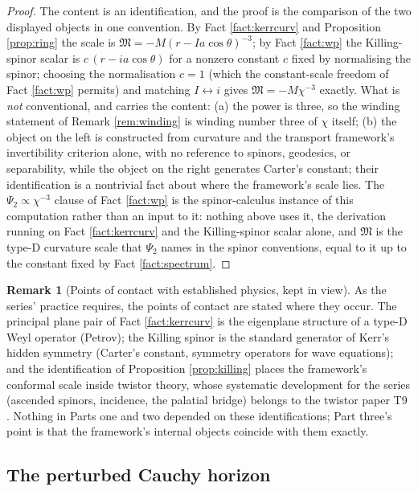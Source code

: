 \documentclass[11pt]{article}
\theoremstyle{definition}
\newtheorem{remark}[theorem]{Remark}
\begin{document}
\begin{proof}
The content is an identification, and the proof is the comparison of the two displayed objects in one convention. By Fact \ref{fact:kerrcurv} and Proposition \ref{prop:ring} the scale is $\mathfrak M = -M(r - Ia\cos\theta)^{-3}$; by Fact \ref{fact:wp} the Killing-spinor scalar is $c\,(r - ia\cos\theta)$ for a nonzero constant $c$ fixed by normalising the spinor; choosing the normalisation $c = 1$ (which the constant-scale freedom of Fact \ref{fact:wp} permits) and matching $I \leftrightarrow i$ gives $\mathfrak M = -M\chi^{-3}$ exactly. What is \emph{not} conventional, and carries the content: (a) the power is three, so the winding statement of Remark \ref{rem:winding} is winding number three of $\chi$ itself; (b) the object on the left is constructed from curvature and the transport framework's invertibility criterion alone, with no reference to spinors, geodesics, or separability, while the object on the right generates Carter's constant; their identification is a nontrivial fact about where the framework's scale lies. The $\Psi_2 \propto \chi^{-3}$ clause of Fact \ref{fact:wp} is the spinor-calculus instance of this computation rather than an input to it: nothing above uses it, the derivation running on Fact \ref{fact:kerrcurv} and the Killing-spinor scalar alone, and $\mathfrak M$ is the type-D curvature scale that $\Psi_2$ names in the spinor conventions, equal to it up to the constant fixed by Fact \ref{fact:spectrum}.
\end{proof}

\begin{remark}[Points of contact with established physics, kept in view]\label{rem:kerrtouch}
As the series' practice requires, the points of contact are stated where they occur. The principal plane pair of Fact \ref{fact:kerrcurv} is the eigenplane structure of a type-D Weyl operator (Petrov); the Killing spinor is the standard generator of Kerr's hidden symmetry (Carter's constant, symmetry operators for wave equations); and the identification of Proposition \ref{prop:killing} places the framework's conformal scale inside twistor theory, whose systematic development for the series (ascended spinors, incidence, the palatial bridge) belongs to the twistor paper T9 \cite{ButlerT9}. Nothing in Parts one and two depended on these identifications; Part three's point is that the framework's internal objects coincide with them exactly.
\end{remark}

\subsection{The perturbed Cauchy horizon}\label{subsec:cauchy}
\end{document}
